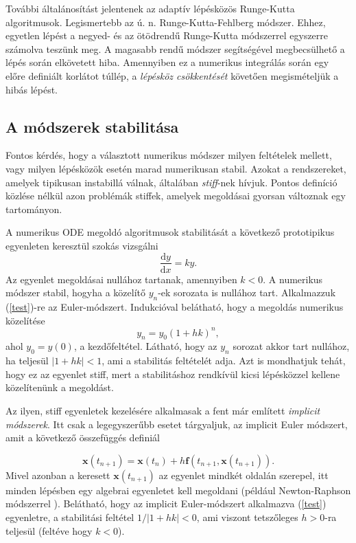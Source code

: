 \documentclass[12pt]{article}
\theoremstyle{plain}
\newcommand{\xvec}{\mathbf{x}}
\begin{document}
További általánosítást jelentenek az adaptív lépésközös Runge-Kutta algoritmusok. Legismertebb az ú. n. Runge-Kutta-Fehlberg módszer. Ehhez, egyetlen lépést a negyed- és az ötödrendű Runge-Kutta módszerrel egyszerre számolva teszünk meg. A magasabb rendű módszer segítségével megbecsülhető a lépés során elkövetett hiba. Amennyiben ez a numerikus integrálás során egy előre definiált korlátot túllép, a {\em lépésköz csökkentését} követően megismételjük a hibás lépést. 
\subsection{A módszerek stabilitása}
Fontos kérdés, hogy a választott numerikus módszer milyen feltételek mellett, vagy milyen lépésközök esetén marad numerikusan stabil. Azokat a rendszereket, amelyek tipikusan instabillá válnak, általában {\em stiff}-nek hívjuk. Pontos definíció közlése nélkül azon problémák stiffek, amelyek megoldásai gyorsan változnak egy tartományon. 

A numerikus ODE megoldó algoritmusok stabilitását a következő prototipikus egyenleten keresztül szokás vizsgálni
\begin{equation}
\label{test}
    \frac{\text{d}y}{\text{d}x} = k y.
\end{equation}
Az egyenlet megoldásai nullához tartanak, amennyiben $k<0$. A numerikus módszer stabil, hogyha a közelítő $y_n$-ek sorozata is nullához tart. Alkalmazzuk (\ref{test})-re az Euler-módszert. Indukcióval belátható, hogy a megoldás numerikus közelítése 
$$
y_n = y_0(1+hk)^n,
$$
ahol $y_0 = y(0)$, a kezdőfeltétel. Látható, hogy az $y_n$ sorozat akkor tart nullához, ha teljesül $|1 + hk| < 1$, ami a stabilitás feltételét adja. Azt is mondhatjuk tehát, hogy ez az egyenlet stiff, mert a stabilitáshoz rendkívül kicsi lépésközzel kellene közelítenünk a megoldást. 

Az ilyen, stiff egyenletek kezelésére alkalmasak a fent már említett {\em implicit módszerek}. Itt csak a legegyszerűbb esetet tárgyaljuk, az implicit Euler módszert, amit a következő összefüggés definiál

\begin{equation}
\label{beuler}
    \xvec(t_{n+1}) = \xvec(t_n) + h\mathbf{f}(t_{n+1}, \xvec(t_{n+1})).
\end{equation}
Mivel azonban a keresett $\xvec(t_{n+1})$ az egyenlet mindkét oldalán szerepel, itt minden lépésben egy algebrai egyenletet kell megoldani (például Newton-Raphson módszerrel \cite{landau}). Belátható, hogy az implicit Euler-módszert alkalmazva (\ref{test}) egyenletre, a stabilitási feltétel $1/|1 + hk| < 0$, ami viszont tetszőleges $h>0$-ra teljesül (feltéve hogy $k<0$).  
\end{document}
